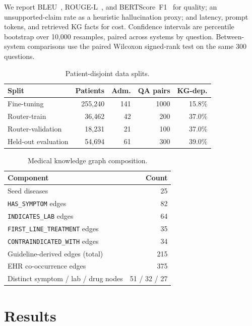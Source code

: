 \documentclass[conference]{IEEEtran}
\begin{document}
We report BLEU~\cite{papineni2002}, ROUGE-L~\cite{lin2004}, and
BERTScore~F1~\cite{zhang2020} for quality; an unsupported-claim rate as
a heuristic hallucination proxy; and
latency, prompt tokens, and retrieved KG facts for cost. Confidence intervals are percentile bootstrap over
10{,}000 resamples, paired across systems by question. Between-system
comparisons use the paired Wilcoxon signed-rank test on the same 300
questions.

\begin{table}[t]
\centering
\footnotesize
\setlength{\tabcolsep}{4pt}
\caption{Patient-disjoint data splits.}
\label{tab:splits}
\begin{tabular}{lrrrr}
\toprule
Split & Patients & Adm. & QA pairs & KG-dep. \\
\midrule
Fine-tuning        & 255{,}240 & 141 & 1000 & 15.8\% \\
Router-train       &  36{,}462 &  42 &  200 & 37.0\% \\
Router-validation  &  18{,}231 &  21 &  100 & 37.0\% \\
Held-out evaluation&  54{,}694 &  61 &  300 & 39.0\% \\
\bottomrule
\end{tabular}
\end{table}

\begin{table}[t]
\centering
\footnotesize
\setlength{\tabcolsep}{4pt}
\caption{Medical knowledge graph composition.}
\label{tab:mkg}
\begin{tabular}{lr}
\toprule
Component & Count \\
\midrule
Seed diseases                       & 25 \\
\texttt{HAS\_SYMPTOM} edges         & 82 \\
\texttt{INDICATES\_LAB} edges       & 64 \\
\texttt{FIRST\_LINE\_TREATMENT} edges & 35 \\
\texttt{CONTRAINDICATED\_WITH} edges  & 34 \\
\midrule
Guideline-derived edges (total)     & 215 \\
EHR co-occurrence edges             & 375 \\
\midrule
Distinct symptom / lab / drug nodes & 51 / 32 / 27 \\
\bottomrule
\end{tabular}
\end{table}

\section{Results}
\label{sec:results}
\end{document}
